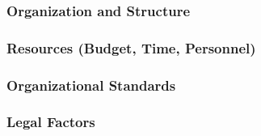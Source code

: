 \subsubsection{Organization and Structure}


\subsubsection{Resources (Budget, Time, Personnel)}


\subsubsection{Organizational Standards}

\subsubsection{Legal Factors}


